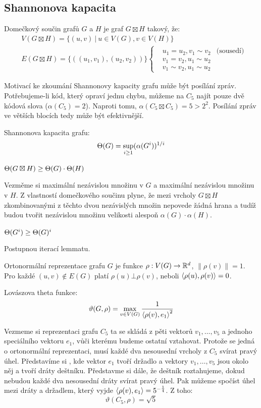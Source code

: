 \subsection{Shannonova kapacita}


\df Domečkový součin grafů $G$ a $H$ je graf $G \boxtimes H$ takový, že:
\begin{align*}
	&V(G \boxtimes H) = \{ (u,v) \ |\  u\in V(G), v\in V(H) \} \\
	&E(G \boxtimes H) = \{ ((u_1,v_1),(u_2,v_2))\} \left\{\begin{matrix}
		&u_1 = u_2, v_1 \sim v_2 &\text{(sousedí)} \\
		&v_1 = v_2, u_1 \sim u_2 \\
		&v_1 \sim v_2, u_1 \sim u_2
		\end{matrix}\right.
\end{align*}

Motivací ke zkoumání Shannonovy kapacity grafu může být posílání zpráv.
Potřebujeme-li kód, který opraví jednu chybu, můžeme na $C_5$ najít pouze dvě
kódová slova ($\alpha(C_5) = 2$). Naproti tomu, $\alpha(C_5 \boxtimes C_5) = 5
> 2^2$. Posílání zpráv ve větších blocích tedy může být efektivnější.

\df Shannonova kapacita grafu:
$$\Theta(G) = \sup_{i\ge 1}(\alpha(G^i))^{1/i}$$

\lm $\Theta(G\boxtimes H) \ge \Theta(G) \cdot \Theta(H)$

\dk Vezměme si maximální nezávislou množinu v $G$ a maximální nezávislou
množinu v $H$. Z vlastností domečkového součinu plyne, že mezi vrcholy
$G\boxtimes H$ zkombinovanými z těchto dvou nezávislých množin nepovede žádná hrana a tudíž
budou tvořit nezávislou množinu velikosti alespoň $\alpha(G)\cdot\alpha(H)$.

\poz $\Theta(G^i) \ge \Theta(G)^i$

\dk Postupnou iterací lemmatu.

\df Ortonormální reprezentace grafu $G$ je funkce $\rho: V(G) \rightarrow \mathbb{R}^d$,
$\|\rho(v)\| = 1$. Pro každé $(u,v) \not\in E(G)$ platí $\rho(u)\bot\rho(v)$,
neboli ${\langle \rho(u), \rho(v)\rangle} = 0$.

\df Lovászova theta funkce:
$$\vartheta(G,\rho) = \max_{v\in V(G)} {1\over {\langle \rho(v),e_1\rangle}^2}$$

Vezmeme si reprezentaci grafu $C_5$ ta se skládá z pěti vektorů $v_1, \dots,
v_5$ a jednoho speciálního vektoru $e_1$, vůči kterému budeme ostatní
vztahovat. Protože se jedná o ortonormální reprezentaci, musí každé dva
nesousední vrcholy z $C_5$ svírat pravý úhel. Představíme si ,
kde vektor $e_1$ tvoří držadlo a vektory $v_1, \dots, v_5$ jsou okolo něj a
tvoří dráty deštníku. Představme si dále, že deštník roztahujeme, dokud nebudou každé dva nesousední dráty svírat pravý úhel. Pak můžeme spočíst úhel mezi dráty a držadlem, který vyjde ${\langle \rho(v),e_1\rangle} = 5^{-{1\over 4}}$. Z toho:
$$
\vartheta(C_5,\rho) = \sqrt 5
$$

